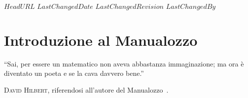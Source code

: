 \svnidlong
{$HeadURL$}
{$LastChangedDate$}
{$LastChangedRevision$}
{$LastChangedBy$}

\chapter*{Introduzione al Manualozzo\texttrademark\ }

\begin{introduction}
``Sai, per essere un matematico non aveva abbastanza immaginazione; ma ora è diventato un poeta e se la cava davvero bene.''
\begin{flushright}
	\textsc{David Hilbert,} riferendosi  all'autore del Manualozzo\texttrademark\ .
\end{flushright}
\end{introduction}

